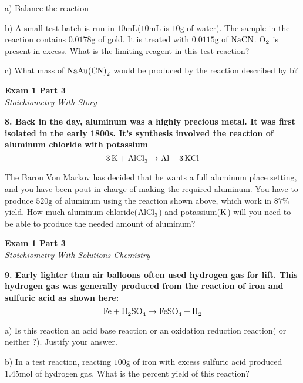 \documentclass{article}
\begin{document}
    a) Balance the reaction

    b) A small test batch is run in $10 \si{\milli\liter}$($10 \si{\milli\liter}$ is $10 \si{\gram}$ of water). The sample in the reaction contains $0.0178 \si{\gram}$ of gold. It is treated with $0.0115 \si{\gram}$ of $\ce{NaCN}$. $\ce{O_{2}}$ is present in excess. What is the limiting reagent in this test reaction?

    c) What mass of $\ce{NaAu(CN)_{2}}$ would be produced by the reaction described by b?

    \pagebreak

    \begin{center}
        \textbf{Exam 1 Part 3}\\
        \textit{Stoichiometry With Story}
    \end{center}
    \textbf{8. Back in the day, aluminum was a highly precious metal. It was first isolated in the early 1800s. It's synthesis involved the reaction of aluminum chloride with potassium}
    $$ \ce{3K} + \ce{AlCl_{3}} \rightarrow \ce{Al} + \ce{3KCl}$$

    The Baron Von Markov has decided that he wants a full aluminum place setting, and you have been pout in charge of making the required aluminum. You have to produce $520 \si{\gram}$ of aluminum using the reaction shown above, which work in $87\%$ yield. How much aluminum chloride($\ce{AlCl_{3}}$) and potassium($\ce{K}$) will you need to be able to produce the needed amount of aluminum?

    \pagebreak

    \begin{center}
        \textbf{Exam 1 Part 3}\\
        \textit{Stoichiometry With Solutions Chemistry}
    \end{center}
    \textbf{9. Early lighter than air balloons often used hydrogen gas for lift. This hydrogen gas was generally produced from the reaction of iron and sulfuric acid as shown here:}
    $$\ce{Fe} + \ce{H_{2}SO_{4}} \rightarrow \ce{FeSO_{4}} + \ce{H_{2}}$$

    a) Is this reaction an acid base reaction or an oxidation reduction reaction( or neither ?). Justify your answer.

    b) In a test reaction, reacting $100 \si{\gram}$ of iron with excess sulfuric acid produced $1.45 \si{\mole}$ of hydrogen gas. What is the percent yield of this reaction?
\end{document}
